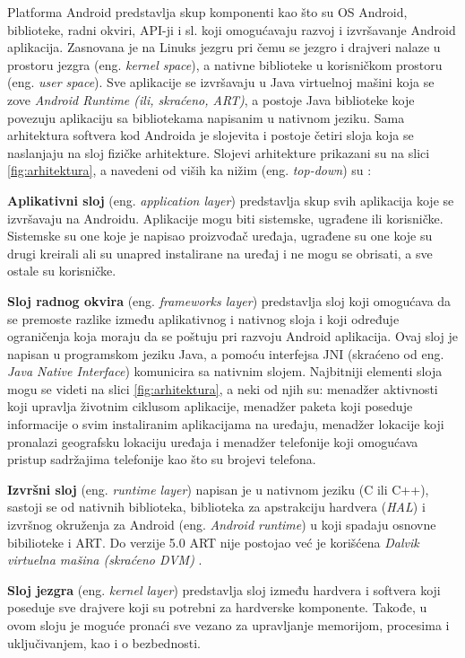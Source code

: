 \documentclass[android.tex]{subfiles}
\begin{document}
Platforma Android predstavlja skup komponenti kao što su OS Android, biblioteke, radni okviri, API-ji i sl. koji omogućavaju razvoj i izvršavanje Android aplikacija. Zasnovana je na Linuks jezgru pri čemu se jezgro i drajveri nalaze u prostoru jezgra (eng. \textit{kernel space}), a nativne biblioteke u korisničkom prostoru (eng. \textit{user space}). Sve aplikacije se izvršavaju u Java virtuelnoj mašini koja se zove \textit{Android Runtime (ili, skraćeno, ART)}, a postoje Java biblioteke koje povezuju aplikaciju sa bibliotekama napisanim u nativnom jeziku. Sama arhitektura softvera kod Androida je slojevita i postoje četiri sloja koja se naslanjaju na sloj fizičke arhitekture. Slojevi arhitekture prikazani su na slici \ref{fig:arhitektura}, a navedeni od viših ka nižim (eng. \textit{top-down}) su \cite{book:papp}:
\begin{description}
\item \textbf{Aplikativni sloj} (eng. \textit{application layer}) predstavlja skup svih aplikacija koje se izvršavaju na Androidu. Aplikacije mogu biti sistemske, ugrađene ili korisničke. Sistemske su one koje je napisao proizvođač uređaja, ugrađene su one koje su drugi kreirali ali su unapred instalirane na uređaj i ne mogu se obrisati, a sve ostale su korisničke.
\item \textbf{Sloj radnog okvira} (eng. \textit{frameworks layer}) predstavlja sloj koji omogućava da se premoste razlike između aplikativnog i nativnog sloja i koji određuje ograničenja koja moraju da se poštuju pri razvoju Android aplikacija. Ovaj sloj je napisan u programskom jeziku Java, a pomoću interfejsa JNI (skraćeno od eng. \textit{Java Native Interface}) komunicira sa nativnim slojem. Najbitniji elementi sloja mogu se videti na slici \ref{fig:arhitektura}, a neki od njih su: menadžer aktivnosti koji upravlja životnim ciklusom aplikacije, menadžer paketa koji poseduje informacije o svim instaliranim aplikacijama na uređaju, menadžer lokacije koji pronalazi geografsku lokaciju uređaja i menadžer telefonije koji omogućava pristup sadržajima telefonije kao što su brojevi telefona. 
\item \textbf{Izvršni sloj} (eng. \textit{runtime layer}) napisan je u nativnom jeziku (C ili C++), sastoji se od nativnih biblioteka, biblioteka za apstrakciju hardvera (\textit{HAL}) i izvršnog okruženja za Android (eng. \textit{Android runtime}) u koji spadaju osnovne bibilioteke i ART. Do verzije 5.0 ART nije postojao već je korišćena \textit{Dalvik virtuelna mašina (skraćeno DVM)} \cite{sajt:dalvik}. 
\item \textbf{Sloj jezgra} (eng. \textit{kernel layer}) predstavlja sloj između hardvera i softvera koji poseduje sve drajvere koji su potrebni za hardverske komponente. Takođe, u ovom sloju je moguće pronaći sve vezano za upravljanje memorijom, procesima i uključivanjem, kao i o bezbednosti. 
\end{description}
\end{document}
